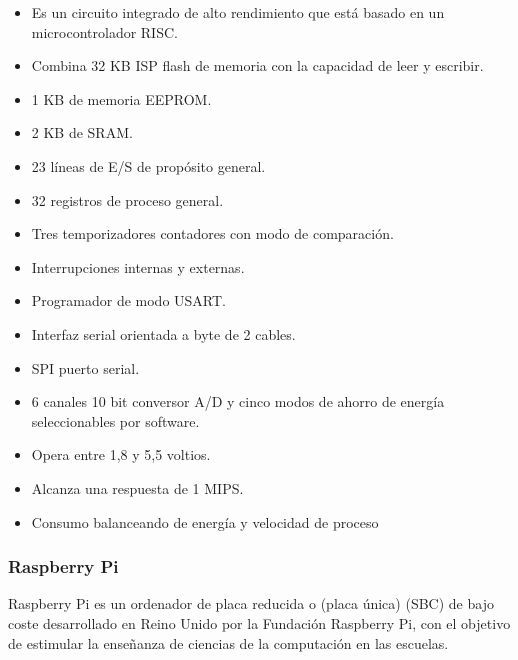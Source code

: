 				\begin{itemize}	
					
					\item Es un circuito integrado de alto rendimiento que está basado en un microcontrolador RISC.
					
					\item Combina 32 KB ISP flash de memoria con la capacidad de leer y escribir.
					
					\item 1 KB de memoria EEPROM.
					
					\item 2 KB de SRAM.
					
					\item 23 líneas de E/S de propósito general.
					
					\item 32 registros de proceso general.
					
					\item  Tres temporizadores contadores con modo de comparación.
					
					\item Interrupciones internas y externas.
					
					\item Programador de modo USART.
					
					\item Interfaz serial orientada a byte de 2 cables.
					
					\item SPI puerto serial.
					
					\item 6 canales 10 bit conversor A/D y cinco modos de ahorro de energía seleccionables por software.
					
					\item Opera entre 1,8 y 5,5 voltios.
					
					\item Alcanza una respuesta de 1 MIPS.
					
					\item Consumo balanceando de energía y velocidad de proceso
					
				\end{itemize}
		
			\subsubsection{Raspberry Pi}
			
				Raspberry Pi \cite{RaspBerryPi} es un ordenador de placa reducida o (placa única) (SBC) de bajo coste desarrollado en Reino Unido por la Fundación Raspberry Pi, con el objetivo de estimular la enseñanza de ciencias de la computación en las escuelas.
				

